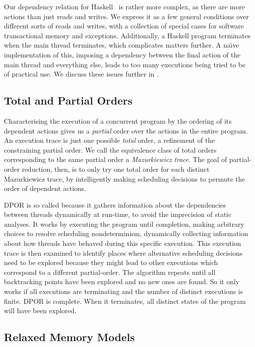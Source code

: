 Our dependency relation for Haskell~ is rather
more complex, as there are more actions than just reads and writes.
We express it as a few general conditions over different sorts of
reads and writes, with a collection of special cases for software
transactional memory and exceptions.  Additionally, a Haskell program
terminates when the main thread terminates, which complicates matters
further.  A na\"{\i}ve implementation of this, imposing a dependency
between the final action of the main thread and everything else, leads
to too many executions being tried to be of practical use.  We discuss
these issues further in .

\subsection{Total and Partial Orders}

Characterising the execution of a concurrent program by the ordering
of its dependent actions gives us a \emph{partial} order over the
actions in the entire program.  An execution trace is just one
possible \emph{total} order, a refinement of the constraining partial
order.  We call the equivalence class of total orders corresponding to
the same partial order a \emph{Mazurkiewicz
  trace}\cite{mazurkiewicz1986}.  The goal of partial-order reduction,
then, is to only try one total order for each distinct Mazurkiewicz
trace, by intelligently making scheduling decisions to permute the
order of dependent actions.

DPOR is so called because it gathers information about the
dependencies between threads dynamically at run-time, to avoid the
imprecision of static analyses\cite{flanagan2005}.  It works by
executing the program until completion, making arbitrary choices to
resolve scheduling nondeterminism, dynamically collecting information
about how threads have behaved during this specific execution.  This
execution trace is then examined to identify places where alternative
scheduling decisions need to be explored because they might lead to
other executions which correspond to a different partial-order.  The
algorithm repeats until all backtracking points have been explored and
no new ones are found.  So it only works if all executions are
terminating and the number of distinct executions is finite.  DPOR is
complete.  When it terminates, all distinct states of the program will
have been explored.

\subsection{Relaxed Memory Models}

